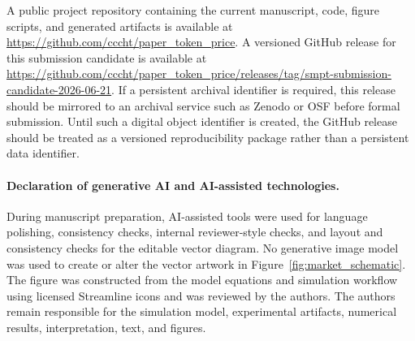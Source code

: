 \documentclass[11pt,a4paper]{article}
\begin{document}
A public project repository containing the current manuscript, code, figure scripts, and generated artifacts is available at \url{https://github.com/cccht/paper_token_price}. A versioned GitHub release for this submission candidate is available at \url{https://github.com/cccht/paper_token_price/releases/tag/smpt-submission-candidate-2026-06-21}. If a persistent archival identifier is required, this release should be mirrored to an archival service such as Zenodo or OSF before formal submission. Until such a digital object identifier is created, the GitHub release should be treated as a versioned reproducibility package rather than a persistent data identifier.

\paragraph{Declaration of generative AI and AI-assisted technologies.}

During manuscript preparation, AI-assisted tools were used for language polishing, consistency checks, internal reviewer-style checks, and layout and consistency checks for the editable vector diagram. No generative image model was used to create or alter the vector artwork in Figure~\ref{fig:market_schematic}. The figure was constructed from the model equations and simulation workflow using licensed Streamline icons and was reviewed by the authors. The authors remain responsible for the simulation model, experimental artifacts, numerical results, interpretation, text, and figures.

\small


\end{document}
